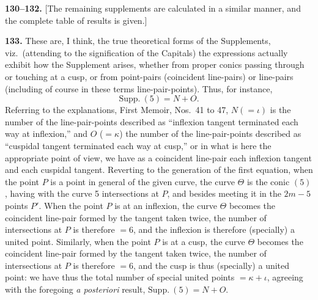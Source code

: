 \documentclass[11pt,a4paper]{article}
\theoremstyle{definition}
\begin{document}
\medskip
\noindent\textbf{130--132.} [The remaining supplements are calculated in a similar manner, and the complete table of results is given.]

\medskip
\noindent\textbf{133.} These are, I think, the true theoretical forms of the Supplements, viz.\ (attending to the signification of the Capitals) the expressions actually exhibit how the Supplement arises, whether from proper conics passing through or touching at a cusp, or from point-pairs (coincident line-pairs) or line-pairs (including of course in these terms line-pair-points). Thus, for instance,
\[
\text{Supp.}\ (5) = N + O.
\]
Referring to the explanations, First Memoir, Nos.~41 to 47, $N (= \iota)$ is the number of the line-pair-points described as ``inflexion tangent terminated each way at inflexion,'' and $O$ ($= \kappa$) the number of the line-pair-points described as ``cuspidal tangent terminated each way at cusp,'' or in what is here the appropriate point of view, we have as a coincident line-pair each inflexion tangent and each cuspidal tangent. Reverting to the generation of the first equation, when the point $P$ is a point in general of the given curve, the curve $\Theta$ is the conic $(5)$, having with the curve 5 intersections at $P$, and besides meeting it in the $2m - 5$ points $P'$. When the point $P$ is at an inflexion, the curve $\Theta$ becomes the coincident line-pair formed by the tangent taken twice, the number of intersections at $P$ is therefore $= 6$, and the inflexion is therefore (specially) a united point. Similarly, when the point $P$ is at a cusp, the curve $\Theta$ becomes the coincident line-pair formed by the tangent taken twice, the number of intersections at $P$ is therefore $= 6$, and the cusp is thus (specially) a united point: we have thus the total number of special united points $= \kappa + \iota$, agreeing with the foregoing \textit{a posteriori} result, $\text{Supp.}\ (5) = N + O$.
\end{document}
